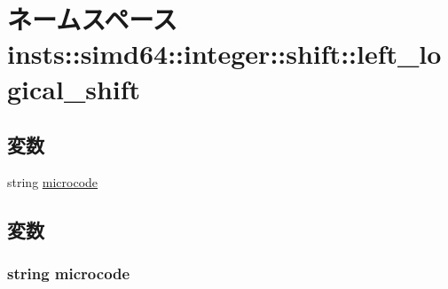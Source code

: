 \hypertarget{namespaceinsts_1_1simd64_1_1integer_1_1shift_1_1left__logical__shift}{
\section{ネームスペース insts::simd64::integer::shift::left\_\-logical\_\-shift}
\label{namespaceinsts_1_1simd64_1_1integer_1_1shift_1_1left__logical__shift}
}
\subsection*{変数}
\begin{DoxyCompactItemize}
\item 
string \hyperlink{namespaceinsts_1_1simd64_1_1integer_1_1shift_1_1left__logical__shift_a770f11a173e99389a8802f0107ed8f52}{microcode}
\end{DoxyCompactItemize}


\subsection{変数}
\hypertarget{namespaceinsts_1_1simd64_1_1integer_1_1shift_1_1left__logical__shift_a770f11a173e99389a8802f0107ed8f52}{
\subsubsection[{microcode}]{\setlength{\rightskip}{0pt plus 5cm}string {\bf microcode}}}
\label{namespaceinsts_1_1simd64_1_1integer_1_1shift_1_1left__logical__shift_a770f11a173e99389a8802f0107ed8f52}
